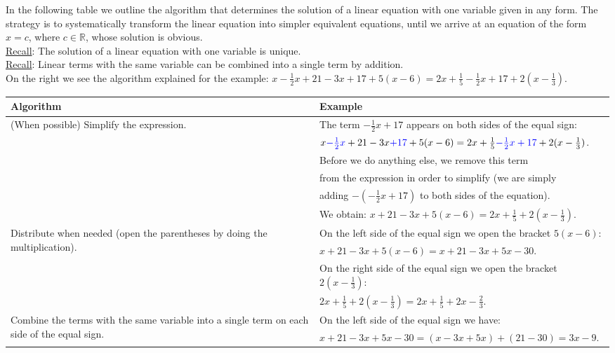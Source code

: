 \documentclass[12pt]{article}
\begin{document}
In the following table we outline the algorithm that determines the solution of a linear equation with one variable given in any form. The strategy is to systematically transform the linear equation into simpler equivalent equations, until we arrive at an equation of the form $x=c$, where $c\in \mathbb{R}$, whose solution is obvious. \\
\underline{Recall}: The solution of a linear equation with one variable is unique.\\
\underline{Recall}: Linear terms with the same variable can be combined into a single term by addition.\\
On the right we see the algorithm explained for the example: $x-\frac{1}{2}x+21-3x+17+5(x-6)=2x+\frac{1}{5}-\frac{1}{2}x+17+2(x-\frac{1}{3})$.

\begin{table*}[h!]
\centering
\begin{tabular}{ l | l }
Algorithm & Example \\
\hline
\multirow{6}{15em}{(When possible) Simplify the expression.} & The term $-\frac{1}{2}x+17$ appears on both sides of the equal sign:\\
		& $x\textcolor{blue}{-\frac{1}{2}x}+21-3x\textcolor{blue}{+17}+5(x-6)=2x+\frac{1}{5}\textcolor{blue}{-\frac{1}{2}x+17}+2(x-\frac{1}{3})$.\\
		& Before we do anything else, we remove this term\\
		& from the expression in order to simplify (we are simply\\
		& adding $-(-\frac{1}{2}x+17)$ to both sides of the equation).\\
		& We obtain: $x+21-3x+5(x-6)=2x+\frac{1}{5}+2(x-\frac{1}{3})$.\\\hline
\multirow{4}{15em}{Distribute when needed (open the parentheses by doing the multiplication).}& On the left side of the equal sign we open the bracket $5(x-6)$:\\
       & $x+21-3x+5(x-6)=x+21-3x+5x-30$.\\
       & On the right side of the equal sign we open the bracket $2(x-\frac{1}{3})$:\\
       & $2x+\frac{1}{5}+2(x-\frac{1}{3})=2x+\frac{1}{5}+2x-\frac{2}{3}$.
\\\hline
\multirow{4}{15em}{Combine the terms with the same variable into a single term on each side of the equal sign.} & On the left side of the equal sign we have:\\
		& $x+21-3x+5x-30=(x-3x+5x)+(21-30)=3x-9$.\\

\end{tabular}
\end{table*}
\end{document}

